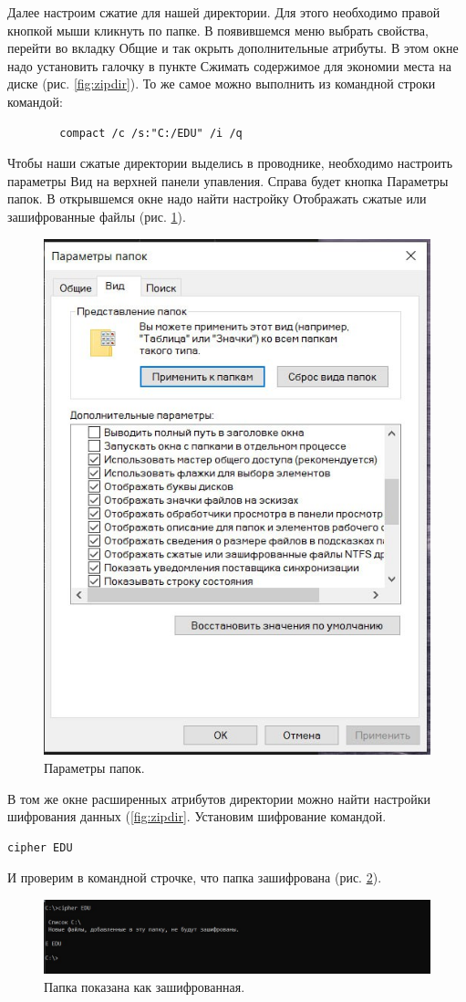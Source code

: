 Далее настроим сжатие для нашей директории. Для этого необходимо правой кнопкой мыши кликнуть по папке. В появившемся меню выбрать свойства, перейти во вкладку Общие и так окрыть дополнительные атрибуты. В этом окне надо установить галочку в пункте Сжимать содержимое для экономии места на диске (рис. \ref{fig:zipdir}). То же самое можно выполнить из командной строки командой:
\begin{verbatim}
        compact /c /s:"C:/EDU" /i /q
\end{verbatim}

Чтобы наши сжатые директории выделись в проводнике, необходимо настроить параметры Вид на верхней панели упавления. Справа будет кнопка Параметры папок. В открывшемся окне надо найти настройку Отображать сжатые или зашифрованные файлы (рис. \ref{fig:dirparam}).

\begin{figure}[h!]
    \centering
    \includegraphics[width=0.5\linewidth]{Pic/lab2/photo_2025-05-21_21-19-06.jpg}
    \caption{Параметры папок.}
    \label{fig:dirparam}
\end{figure}

В том же окне расширенных атрибутов директории можно найти настройки шифрования данных (\ref{fig:zipdir}. Установим шифрование командой. \begin{verbatim}cipher EDU\end{verbatim}

И проверим в командной строчке, что папка зашифрована (рис. \ref{fig:cipher}).

\begin{figure}
    \centering
    \includegraphics[width=0.5\linewidth]{Pic/lab2/photo_2025-05-21_21-19-09.jpg}
    \caption{Папка показана как зашифрованная.}
    \label{fig:cipher}
\end{figure}

